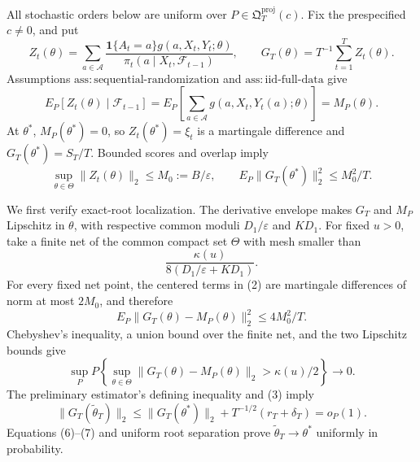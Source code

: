 All stochastic orders below are uniform over
\(P\in\mathfrak Q_T^{\mathrm{proj}}(c)\).  Fix the prespecified \(c\ne0\),
and put
\[
 Z_t(\theta)=\sum_{a\in\mathcal A}
 \frac{\mathbf1\{A_t=a\}g(a,X_t,Y_t;\theta)}
 {\pi_t(a\mid X_t,\mathcal F_{t-1})},
 \qquad G_T(\theta)=T^{-1}\sum_{t=1}^TZ_t(\theta).
\tag{1}
\]
Assumptions \(\mathrm{ass:sequential\text{-}randomization}\) and
\(\mathrm{ass:iid\text{-}full\text{-}data}\) give
\[
 E_P[Z_t(\theta)\mid\mathcal F_{t-1}]
 =E_P\!\left[\sum_{a\in\mathcal A}g(a,X_t,Y_t(a);\theta)\right]
 =M_P(\theta).
\tag{2}
\]
At \(\theta^*\), \(M_P(\theta^*)=0\), so
\(Z_t(\theta^*)=\xi_t\) is a martingale difference and
\(G_T(\theta^*)=S_T/T\).  Bounded scores and overlap imply
\[
 \sup_{\theta\in\Theta}\|Z_t(\theta)\|_2\le M_0:=B/\varepsilon,
 \qquad E_P\|G_T(\theta^*)\|_2^2\le M_0^2/T.
\tag{3}
\]

We first verify exact-root localization.  The derivative envelope makes
\(G_T\) and \(M_P\) Lipschitz in \(\theta\), with respective common moduli
\(D_1/\varepsilon\) and \(KD_1\).  For fixed \(u>0\), take a finite net of
the common compact set \(\Theta\) with mesh smaller than
\[
 \frac{\kappa(u)}{8(D_1/\varepsilon+KD_1)}.
\tag{4}
\]
For every fixed net point, the centered terms in (2) are martingale
differences of norm at most \(2M_0\), and therefore
\[
 E_P\|G_T(\theta)-M_P(\theta)\|_2^2\le4M_0^2/T.
\tag{5}
\]
Chebyshev's inequality, a union bound over the finite net, and the two
Lipschitz bounds give
\[
 \sup_P P\!\left\{\sup_{\theta\in\Theta}
 \|G_T(\theta)-M_P(\theta)\|_2>\kappa(u)/2\right\}\longrightarrow0.
\tag{6}
\]
The preliminary estimator's defining inequality and (3) imply
\[
 \|G_T(\widetilde\theta_T)\|_2
 \le\|G_T(\theta^*)\|_2+T^{-1/2}(r_T+\delta_T)=o_P(1).
\tag{7}
\]
Equations (6)--(7) and uniform root separation prove
\(\widetilde\theta_T\to\theta^*\) uniformly in probability.


